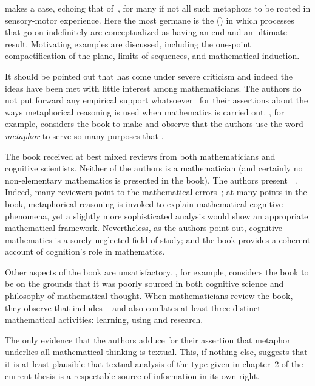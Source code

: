 \wmcf makes a case, echoing that of~, for many if not
all such metaphors to be rooted in sensory-motor experience.  Here the
most germane is the  (\bmi) in
which processes that go on indefinitely are conceptualized as having
an end and an ultimate result.  Motivating examples are discussed,
including the one-point compactification of the plane, limits of
sequences, and mathematical induction.

It should be pointed out that \wmcf has come under severe criticism
and indeed the ideas have been met with little interest among
mathematicians.  The authors do not put forward any empirical support
whatsoever~\parencite{madden2001} for their assertions about the ways
metaphorical reasoning is used when mathematics is carried out.
, for example, considers the book to make
 and observe that the authors
use the word \emph{metaphor} to serve so many purposes that
.

The book received at best mixed reviews from both mathematicians and
cognitive scientists.  Neither of the authors is a mathematician (and
certainly no non-elementary mathematics is presented in the book).
The authors present ~\parencite{henderson2002}.
Indeed, many reviewers point to the 
mathematical errors~\parencite{gold2001}; at many points in the book,
metaphorical reasoning is invoked to explain mathematical cognitive
phenomena, yet a slightly more sophisticated analysis would show an
appropriate mathematical framework.  Nevertheless, as the authors
point out, cognitive mathematics is a sorely neglected field of study;
and the book provides a coherent account of cognition's role in
mathematics.

Other aspects of the book are unsatisfactory.  , for
example, considers the book to be  on the
grounds that it was poorly sourced in both cognitive science and
philosophy of mathematical thought.  When mathematicians review the
book, they observe that \wmcf includes ~\parencite{henderson2002} and also conflates at
least three distinct mathematical activities: learning, using and
research.

The only evidence that the authors adduce for their assertion that
metaphor underlies all mathematical thinking is textual. This, if
nothing else, suggests that it is at least plausible that textual
analysis of the type given in chapter~2 of the current thesis is a
respectable source of information in its own right.

